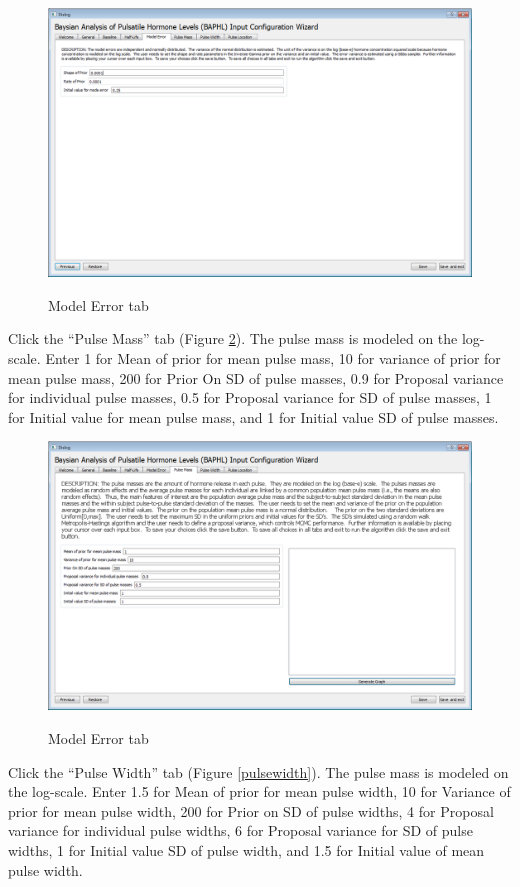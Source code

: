 \documentclass[11pt]{book}
\begin{document}
\begin{figure}
  \centering
  \includegraphics[width=\textwidth]{modelerrortab.PNG}\\
  \caption{Model Error tab}\label{modelerror}
\end{figure}
\newpage
Click the ``Pulse Mass'' tab (Figure \ref{pulsemass}). The pulse mass is modeled on the log-scale. Enter 1 for Mean of prior for mean pulse mass, 10 for variance of prior for mean pulse mass, 200 for Prior On SD of pulse masses, 0.9 for Proposal variance for individual pulse masses, 0.5 for Proposal variance for SD of pulse masses, 1 for Initial value for mean pulse mass, and 1 for Initial value SD of pulse masses.

\begin{figure}
  \centering
  \includegraphics[width=\textwidth]{pulsemasstab.PNG}\\
  \caption{Model Error tab}\label{pulsemass}
\end{figure}
\newpage
Click the ``Pulse Width'' tab (Figure \ref{pulsewidth}). The pulse mass is modeled on the log-scale. Enter 1.5 for Mean of prior for mean pulse width, 10 for Variance of prior for mean pulse width, 200 for Prior on SD of pulse widths, 4 for Proposal variance for individual pulse widths, 6 for Proposal variance for SD of pulse widths, 1 for Initial value SD of pulse width, and 1.5 for Initial value of mean pulse width.
\end{document}
